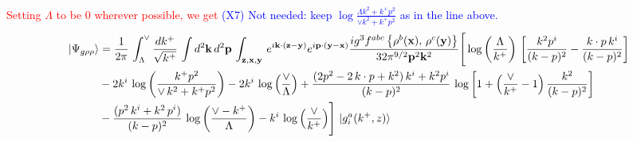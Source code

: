\documentclass[10pt]{article}
\def\v#1{\mathbf{#1}}
\numberwithin{equation}{section}
\begin{document}
\textcolor{red}{Setting $\Lambda $ to be $0$ wherever possible, we get} \textcolor{blue}{(X7) Not needed: keep $\log\frac{\Lambda k^{2}+k^{+}p^{2}}{\vee k^{2}+k^{+}p^{2}}$ as in the line above.}
\begin{align}\label{combinedgrhorhopos}
    \left|\Psi_{g\rho\rho}\right\rangle & =  \frac{1}{2\pi}\,\int_{\Lambda}^{\vee}\frac{dk^{+}}{\sqrt{k^{+}}}\,\int d^{2}\mathbf{k}\, d^{2}\mathbf{p}\,\int_{\v{z},\v{x},\v{y}}\, e^{i\v{k}\cdot (\v{z}-\v{y})} e^{i\v{p}\cdot (\v{y}-\v{x})}\frac{ig^{3}f^{abc}\left\{ \rho^{b}(\mathbf{x}),\,\rho^{c}(\mathbf{y})\right\}}{32\pi^{9/2}\mathbf{p}^{2}\mathbf{k}^{2}}\Bigg[\log{\left(\frac{\Lambda}{k^{+}}\right)}\,\left[\frac{k^{2}p^{i}}{(k-p)^{2}}-\frac{k\cdot p\,k^{i}}{(k-p)^{2}}\right]\notag \\ & -2k^{i}\,\log{\left(\frac{k^{+}p^{2}}{\vee\, k^{2}+k^{+}p^{2}}\right)}-2k^{i}\,\log{\left(\frac{\vee}{\Lambda}\right)}+\frac{(2p^{2}-2\,k\cdot p + k^{2})\,k^{i} + k^{2}p^{i}}{(k-p)^{2}}\, \log{\left[1+\left(\frac{\vee}{k^{+}}-1\right)\frac{k^{2}}{(k-p)^{2}}\right]}\notag \\ & - \frac{(p^{2}\,k^{i}+k^{2}\,p^{i})}{(k-p)^{2}}\, \log{\left(\frac{\vee - k^{+}}{\Lambda}\right)}-k^{i}\, \log{\left(\frac{\vee}{k^{+}}\right)}\Bigg]\, \ket{g^{a}_{i}(k^{+},z)}
\end{align}
\end{document}
